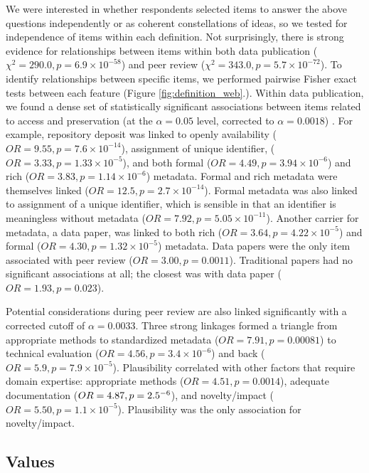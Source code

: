 \documentclass[10pt]{article}
\begin{document}
We were interested in whether respondents selected items to answer the above questions independently or as coherent constellations of ideas, so we tested for independence of items within each definition. 
Not surprisingly, there is strong evidence for relationships between items within both data publication ($\chi^{2}=290.0, p=6.9\times10^{-58}$) and peer review ($\chi^{2}= 343.0, p= 5.7\times10^{-72}$).
To identify relationships between specific items, we performed pairwise Fisher exact tests between each feature (Figure \ref{fig:definition_web}.).
Within data publication, we found a dense set of statistically significant associations between items related to access and preservation (at the $\alpha=0.05$ level, corrected to $\alpha=0.0018$)	.
For example, repository deposit was linked to openly availability ($OR=9.55, p=7.6\times10^{-14}$), assignment of unique identifier, ($OR= 3.33, p= 1.33\times10^{-5}$), and both formal ($OR= 4.49, p= 3.94\times10^{-6}$) and rich ($OR= 3.83, p=1.14\times10^{-6}$) metadata.
Formal and rich metadata were themselves linked ($OR= 12.5, p=2.7\times10^{-14}$). 
Formal metadata was also linked to assignment of a unique identifier, which is sensible in that an identifier is meaningless without metadata ($OR= 7.92, p= 5.05\times10^{-11}$).
Another carrier for metadata, a data paper, was linked to both rich ($OR=3.64, p=4.22\times10^{-5}$) and formal ($OR=4.30, p=1.32\times10^{-5}$) metadata.
Data papers were the only item associated with peer review ($OR=3.00, p=0.0011$).
Traditional papers had no significant associations at all; the closest was with data paper ($OR=1.93, p=0.023$).

Potential considerations during peer review are also linked significantly with a corrected cutoff of $\alpha=0.0033$.
Three strong linkages formed a triangle from appropriate methods to standardized metadata ($OR=7.91, p=0.00081$) to technical evaluation ($OR=4.56, p=3.4\times10^{-6}$) and back ($OR=5.9, p=7.9\times10^{-5}$).
Plausibility correlated with other factors that require domain expertise: appropriate methods ($OR=4.51, p=0.0014$), adequate documentation ($OR=4.87, p=2.5\time10^{-6}$), and novelty/impact ($OR=5.50, p=1.1\times10^{-5}$).
Plausibility was the only association for novelty/impact.

\subsection*{Values}
\end{document}
